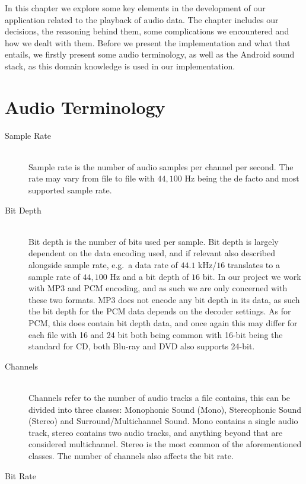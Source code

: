 In this chapter we explore some key elements in the development of our application related to the playback of audio data.
The chapter includes our decisions, the reasoning behind them, some complications we encountered and how we dealt with them.
Before we present the implementation and what that entails, we firstly present some audio terminology, as well as the Android sound stack, as this domain knowledge is used in our implementation.

\section{Audio Terminology}
\begin{description}
    \item [Sample Rate]\cite{sample_rate_std} \hfill \\
    Sample rate is the number of audio samples per channel per second.
    The rate may vary from file to file with $44,100$ Hz being the de facto and most supported sample rate.
    \item [Bit Depth]\cite{bit_depth} \hfill \\
    Bit depth is the number of bits used per sample.
    Bit depth is largely dependent on the data encoding used, and if relevant also described alongside sample rate, e.g.\ a data rate of $44.1$ kHz/$16$ translates to a sample rate of $44,100$ Hz and a bit depth of $16$ bit.
    In our project we work with MP3 and \ac{PCM} encoding, and as such we are only concerned with these two formats.
    MP3 does not encode any bit depth in its data, as such the bit depth for the \ac{PCM} data depends on the decoder settings.
    As for \ac{PCM}, this does contain bit depth data, and once again this may differ for each file with 16 and 24 bit both being common with 16-bit being the standard for CD, both Blu-ray and DVD also supports 24-bit.
    \item [Channels]\cite{channels} \hfill \\
    Channels refer to the number of audio tracks a file contains, this can be divided into three classes: Monophonic Sound (Mono), Stereophonic Sound (Stereo) and Surround/Multichannel Sound.
    Mono contains a single audio track, stereo contains two audio tracks, and anything beyond that are considered multichannel.
    Stereo is the most common of the aforementioned classes.
    The number of channels also affects the bit rate.
    \item [Bit Rate]\cite{bit_rate} \hfill \\

\end{description}
